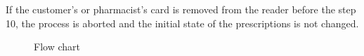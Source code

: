  If the customer's or pharmacist's card is removed from the reader before the step 10, the process is aborted and the initial state of the prescriptions is not changed.
\newpage
{}
\fboxsep=5mm%

\begin{figure}
    \centering
    \hspace*{-0.4in}
    \caption{Flow chart}
    \label{fig:flowchart}
\end{figure} 




